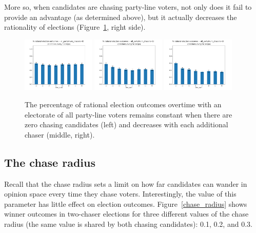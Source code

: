 More so, when candidates are chasing party-line voters, not only does it fail to provide an 
advantage (as determined above), but it actually decreases the rationality of elections 
(Figure~\ref{all_party_hurt_rat}, right side).

\begin{figure}
	\centering
	\includegraphics[width=0.31\textwidth]{assets/all_party_0_chasers_rationality_stays_same.png}
	\includegraphics[width=0.31\textwidth]{assets/all_party_1_chaser_rationality_decreases.png}
	\includegraphics[width=0.31\textwidth]{assets/all_party_3_chasers_rationality_decreases.png}
	\caption{The percentage of rational election outcomes overtime with an electorate of all party-line voters 
		remains constant when there are zero chasing candidates (left) and decreases with each additional chaser (middle, right).}
	\label{all_party_hurt_rat}
\end{figure}

\subsection{The chase radius}

Recall that the chase radius sets a limit on how far candidates can wander in
opinion space every time they chase voters. Interestingly, the value of this
parameter has little effect on election outcomes. Figure~\ref{chase_radius}
shows winner outcomes in two-chaser elections for three different values of the
chase radius (the same value is shared by both chasing candidates): 0.1, 0.2,
and 0.3.

